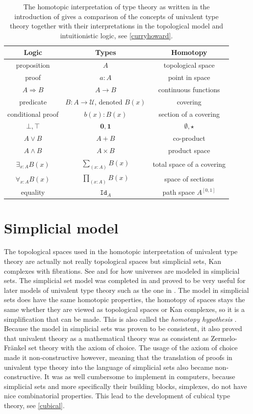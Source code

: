 \documentclass[12pt,a4paper,twoside,xetex]{book} %
\newcommand{\keyword}[1]{\emph{#1}\index{#1}}
\newcommand{\op}[1]{\mathtt{#1}}
\begin{document}
\begin{table}\label{tab:The-homotopic-interpretation}
\centering
\begin{tabular}{|c|c|c|}
\hline 
\textbf{Logic} & \textbf{Types} & \textbf{Homotopy}\tabularnewline
\hline 
proposition & $A$  & topological space\tabularnewline
proof & $a:A$ & point in space\tabularnewline 
$A\Rightarrow B$ & $A\rightarrow B$ & continuous functions\tabularnewline
predicate & $B:A\rightarrow\mathcal{U}$, denoted $B\left(x\right)$ & 
covering\tabularnewline
conditional proof & $b\left(x\right):B\left(x\right)$ & section of a 
covering\tabularnewline 
$\bot,\top$ & $\boldsymbol{0},\boldsymbol{1}$ & $\emptyset,\star$\tabularnewline
$A\vee B$ & $A+B$ & co-product\tabularnewline
$A\wedge B$ & $A\times B$ & product space\tabularnewline
$\exists_{x:A}B\left(x\right)$ & $\sum_{\left(x:A\right)}B\left(x\right)$ & 
total space of a covering\tabularnewline
$\forall_{x:A}B\left(x\right)$ & $\prod_{\left(x:A\right)}B\left(x\right)$ & 
space of sections\tabularnewline
 equality & $\op{Id}_{A}$ & path space $A^{[0,1]}$\tabularnewline
\hline 
\end{tabular}
\caption{The homotopic interpretation of type theory as written in the 
introduction of \cite{Voevodsky2013} gives a comparison of the concepts of 
univalent type theory together with their interpretations in the topological 
model and intuitionistic logic, see \cref{curryhoward}.}
\end{table}




\section{Simplicial model}\label{simpmod}

The topological spaces used in the homotopic interpretation of univalent type 
theory are actually not really topological spaces but simplicial 
sets, Kan complexes with fibrations. See \cite{Streicher2006} and 
\cite{Voevodsky2009} for how universes are modeled in simplicial sets. The 
simplicial set model was completed in \cite{Kapulkin2012} and proved to be very 
useful for later models of univalent type theory such as the one in 
\cite{Cohen2016}. The model in simplicial sets does have the same 
homotopic properties, the homotopy of spaces stays the same whether they are viewed 
as topological spaces or Kan complexes, so it is a simplification that can be 
made. This is also called the \keyword{homotopy hypothesis} 
\cite{Schreiber2018a}. Because the model in simplicial sets was proven to be 
consistent, it also proved that univalent theory as a mathematical theory was as 
consistent as Zermelo-Fr\"ankel set theory with the axiom of choice. The usage 
of the axiom of choice made it non-constructive however, meaning that the 
translation of proofs in univalent type theory into the language of simplicial 
sets also became non-constructive. It was as well cumbersome to implement in 
computers, because simplicial sets and more specifically their building blocks, 
simplexes, do not have nice combinatorial properties. This lead to the 
development of cubical type theory, see \cref{cubical}.
\end{document}
